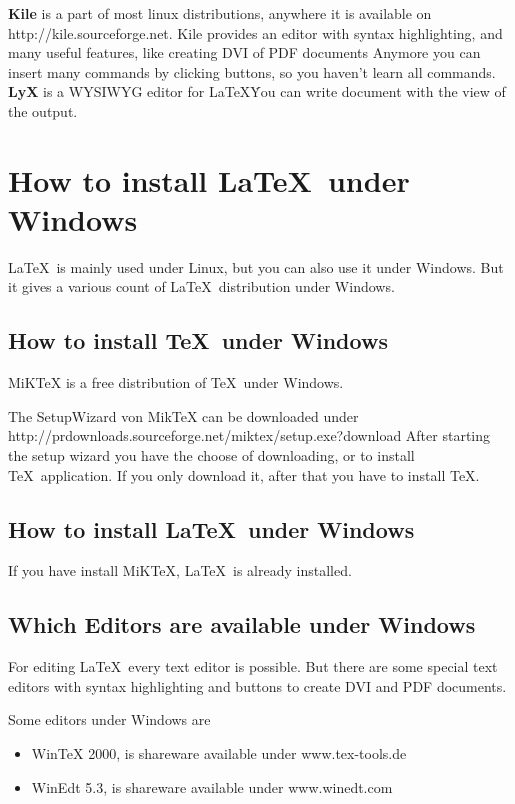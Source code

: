 \textbf{Kile} is a part of most linux distributions, anywhere it is available on http://kile.sourceforge.net.
Kile provides an editor with syntax highlighting, and many useful features, like creating DVI of PDF documents
Anymore you can insert many commands by clicking buttons, so you haven't learn all commands.\\

\textbf{LyX} is a WYSIWYG editor for \LaTeX\. You can write document with the view of the output.


\section{How to install \LaTeX\ under Windows}

\LaTeX\ is mainly used under Linux, but you can also use it under Windows. But it gives a various count of \LaTeX\ distribution under Windows.

\subsection{How to install \TeX\ under Windows}

MiKTeX is a free distribution of \TeX\ under Windows.

The SetupWizard von MikTeX can be downloaded under 
http://prdownloads.sourceforge.net/miktex/setup.exe?download
After starting the setup wizard you have the choose of downloading, or to install \TeX\ application.
If you only download it, after that you have to install \TeX.


\subsection{How to install \LaTeX\ under Windows}

If you have install MiKTeX, \LaTeX\ is already installed.

\subsection{Which Editors are available under Windows}

For editing \LaTeX\ every text editor is possible.
But there are some special text editors with syntax highlighting and buttons to create DVI and PDF documents.

Some editors under Windows are 

\begin{itemize}
\item WinTeX 2000, is shareware available under www.tex-tools.de
\item WinEdt 5.3, is shareware available under www.winedt.com
\end{itemize}

